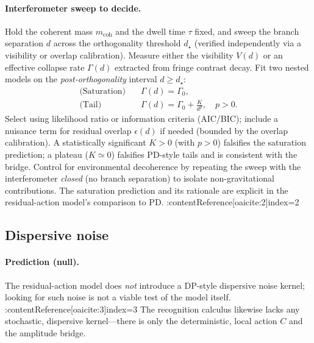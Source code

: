 \documentclass[11pt,letterpaper]{article}
\begin{document}
\paragraph{Interferometer sweep to decide.}
Hold the coherent mass $m_{\mathrm{coh}}$ and the dwell time $\tau$ fixed, and sweep the branch separation $d$ across the orthogonality threshold $d_\star$ (verified independently via a visibility or overlap calibration). Measure either the visibility $V(d)$ or an effective collapse rate $\Gamma(d)$ extracted from fringe contrast decay. Fit two nested models on the \emph{post-orthogonality} interval $d\ge d_\star$:
\begin{align}
\text{(Saturation)}\quad & \Gamma(d)=\Gamma_0, \\
\text{(Tail)}\quad & \Gamma(d)=\Gamma_0 + \frac{K}{d^{p}},\quad p>0.
\end{align}
Select using likelihood ratio or information criteria (AIC/BIC); include a nuisance term for residual overlap $\epsilon(d)$ if needed (bounded by the overlap calibration). A statistically significant $K>0$ (with $p>0$) falsifies the saturation prediction; a plateau ($K\simeq 0$) falsifies PD-style tails and is consistent with the bridge. Control for environmental decoherence by repeating the sweep with the interferometer \emph{closed} (no branch separation) to isolate non-gravitational contributions. The saturation prediction and its rationale are explicit in the residual-action model’s comparison to PD. :contentReference[oaicite:2]{index=2}

\subsection{Dispersive noise}

\paragraph{Prediction (null).}
The residual-action model does \emph{not} introduce a DP-style dispersive noise kernel; looking for such noise is not a viable test of the model itself. :contentReference[oaicite:3]{index=3} The recognition calculus likewise lacks any stochastic, dispersive kernel—there is only the deterministic, local action $C$ and the amplitude bridge.
\end{document}
